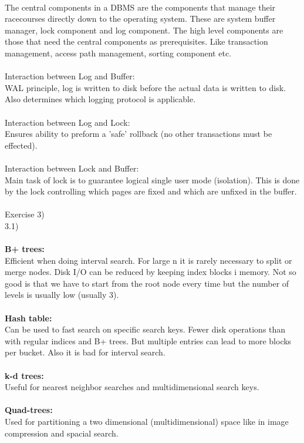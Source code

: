 \documentclass[12pt, letterpaper, twoside]{article}
\begin{document}
\\
The central components in a DBMS are the components that manage their racecourses directly down to the operating system. These are system buffer manager, lock component and log component. The high level components are those that need the central components as prerequisites. Like transaction management, access path management, sorting component etc.\\  
\\
Interaction between Log and Buffer:\\
WAL principle, log is written to disk before the actual data is written to disk. Also determines which logging protocol is applicable.\\
\\
Interaction between Log and Lock:\\
Ensures ability to preform a 'safe' rollback (no other transactions must be effected).\\
\\
Interaction between Lock and Buffer:\\
Main task of lock is to guarantee logical single user mode (isolation). This is done by the lock controlling which pages are fixed and which are unfixed in the buffer.\\
\\
Exercise 3)\\
3.1)\\
\\
\textbf{B+ trees:}\\
Efficient when doing interval search. For large n it is rarely necessary to split or merge nodes. Disk I/O can be reduced by keeping index blocks i memory.
Not so good is that we have to start from the root node every time but the number of levels is usually low (usually 3).\\
\\
\textbf{Hash table:}\\
Can be used to fast search on specific search keys. Fewer disk operations than with regular indices and B+ trees. But multiple entries can lead to more blocks per bucket. Also it is bad for interval search.\\
\\
\textbf{k-d trees:}\\
Useful for nearest neighbor searches and multidimensional search keys.\\
\\
\textbf{Quad-trees:}\\
Used for partitioning a two dimensional (multidimensional) space like in image compression and spacial search.\\
\end{document}
